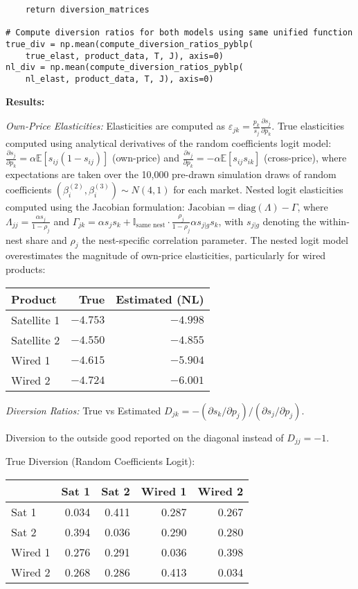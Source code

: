 \documentclass[english,11pt]{article}
\begin{document}
\begin{enumerate}
\begin{verbatim}
    return diversion_matrices

# Compute diversion ratios for both models using same unified function
true_div = np.mean(compute_diversion_ratios_pyblp(
    true_elast, product_data, T, J), axis=0)
nl_div = np.mean(compute_diversion_ratios_pyblp(
    nl_elast, product_data, T, J), axis=0)
\end{verbatim}

\textbf{Results:}

\textit{Own-Price Elasticities:} Elasticities are computed as $\varepsilon_{jk} = \frac{p_k}{s_j} \frac{\partial s_j}{\partial p_k}$. True elasticities computed using analytical derivatives of the random coefficients logit model: $\frac{\partial s_j}{\partial p_k} = \alpha \mathbb{E}[s_{ij}(1-s_{ij})]$ (own-price) and $\frac{\partial s_j}{\partial p_k} = -\alpha \mathbb{E}[s_{ij}s_{ik}]$ (cross-price), where expectations are taken over the 10,000 pre-drawn simulation draws of random coefficients $(\beta_i^{(2)}, \beta_i^{(3)}) \sim N(4,1)$ for each market. Nested logit elasticities computed using the Jacobian formulation: $\text{Jacobian} = \text{diag}(\Lambda) - \Gamma$, where $\Lambda_{jj} = \frac{\alpha s_j}{1-\rho_j}$ and $\Gamma_{jk} = \alpha s_j s_k + \mathbb{I}_{\text{same nest}} \cdot \frac{\rho_j}{1-\rho_j} \alpha s_{j|g} s_k$, with $s_{j|g}$ denoting the within-nest share and $\rho_j$ the nest-specific correlation parameter. The nested logit model overestimates the magnitude of own-price elasticities, particularly for wired products:


\begin{center}
\begin{tabular}{lrr}
\hline
Product & True & Estimated (NL) \\
\hline
Satellite 1 & $-4.753$ & $-4.998$ \\
Satellite 2 & $-4.550$ & $-4.855$ \\
Wired 1 & $-4.615$ & $-5.904$ \\
Wired 2 & $-4.724$ & $-6.001$ \\
\hline
\end{tabular}
\end{center}

\textit{Diversion Ratios:} 
True vs Estimated $D_{jk} = -(\partial s_k/\partial p_j) / (\partial s_j/\partial p_j).$ 

Diversion to the outside good reported on the diagonal instead of $D_{jj}=-1.$ 

True Diversion (Random Coefficients Logit):
\begin{center}
\begin{tabular}{lrrrr}
\hline
 & Sat 1 & Sat 2 & Wired 1 & Wired 2 \\
\hline
Sat 1 & 0.034 & 0.411 & 0.287 & 0.267 \\
Sat 2 & 0.394 & 0.036 & 0.290 & 0.280 \\
Wired 1 & 0.276 & 0.291 & 0.036 & 0.398 \\
Wired 2 & 0.268 & 0.286 & 0.413 & 0.034 \\
\hline
\end{tabular}
\end{center}


\end{enumerate}
\end{document}
